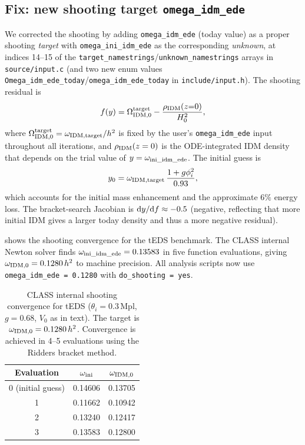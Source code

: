 \documentclass[aps,onecolumn,prd,nofootinbib,superscriptaddress,10pt,longbibliography,floatfix]{revtex4-2}
\begin{document}
\subsection{Fix: new shooting target \texttt{omega\_idm\_ede}}

We corrected the shooting by adding \texttt{omega\_idm\_ede} (today value) as a proper shooting \emph{target} with \texttt{omega\_ini\_idm\_ede} as the corresponding \emph{unknown}, at indices 14--15 of the \texttt{target\_namestrings}/\texttt{unknown\_namestrings} arrays in \texttt{source/input.c} (and two new enum values \texttt{Omega\_idm\_ede\_today}/\texttt{omega\_idm\_ede\_today} in \texttt{include/input.h}). The shooting residual is
\begin{equation}
f(y) = \Omega_{\rm IDM,0}^{\rm target} - \frac{\rho_{\rm IDM}(z{=}0)}{H_0^2},
\end{equation}
where $\Omega_{\rm IDM,0}^{\rm target} = \omega_{\rm IDM,target}/h^2$ is fixed by the user's \texttt{omega\_idm\_ede} input throughout all iterations, and $\rho_{\rm IDM}(z=0)$ is the ODE-integrated IDM density that depends on the trial value of $y = \omega_{\rm ini\_idm\_ede}$. The initial guess is
\begin{equation}
y_0 = \omega_{\rm IDM,target}\,\frac{1 + g\phi_i^2}{0.93},
\end{equation}
which accounts for the initial mass enhancement and the approximate $6\%$ energy loss. The bracket-search Jacobian is ${\rm d}y/{\rm d}f \approx -0.5$ (negative, reflecting that more initial IDM gives a larger today density and thus a more negative residual).

 shows the shooting convergence for the tEDS benchmark. The CLASS internal Newton solver finds $\omega_{\rm ini\_idm\_ede}=0.13583$ in five function evaluations, giving $\omega_{\rm IDM,0}=0.1280\,h^2$ to machine precision. All analysis scripts now use \texttt{omega\_idm\_ede = 0.1280} with \texttt{do\_shooting = yes}.

\begin{table}[ht]
\centering
\begin{tabular}{ccc}
\hline
Evaluation & $\omega_{\rm ini}$ & $\omega_{\rm IDM,0}$ \\
\hline
0 (initial guess) & 0.14606 & 0.13705 \\
1 & 0.11662 & 0.10942 \\
2 & 0.13240 & 0.12417 \\
3 & 0.13583 & 0.12800 \\
\hline
\end{tabular}
\caption{CLASS internal shooting convergence for tEDS ($\theta_i=0.3$\,Mpl, $g=0.68$, $V_0$ as in text). The target is $\omega_{\rm IDM,0}=0.1280\,h^2$. Convergence is achieved in 4--5 evaluations using the Ridders bracket method.}
\label{tab:norm}
\end{table}
\end{document}
